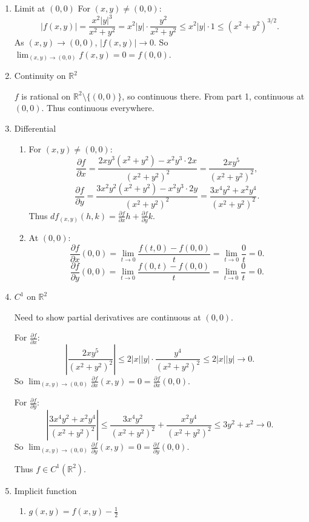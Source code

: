 \documentclass[12pt]{article}
\begin{document}
\begin{answerbox}
\begin{enumerate}
  \item Limit at $(0,0)$
For $(x,y) \neq (0,0)$:
\[
|f(x,y)| = \frac{x^2 |y|^3}{x^2 + y^2} = x^2 |y| \cdot \frac{y^2}{x^2 + y^2} \le x^2 |y| \cdot 1 \le (x^2 + y^2)^{3/2}.
\]
As $(x,y) \to (0,0)$, $|f(x,y)| \to 0$. So $\lim_{(x,y)\to(0,0)} f(x,y) = 0 = f(0,0)$.

  \item Continuity on $\mathbb{R}^2$

$f$ is rational on $\mathbb{R}^2\setminus\{(0,0)\}$, so continuous there. From part 1, continuous at $(0,0)$. Thus continuous everywhere.

  \item Differential
  \begin{enumerate}
    \item For $(x,y) \neq (0,0)$:
\[
\frac{\partial f}{\partial x} = \frac{2x y^3(x^2+y^2) - x^2 y^3 \cdot 2x}{(x^2+y^2)^2} = \frac{2x y^5}{(x^2+y^2)^2},
\]
\[
\frac{\partial f}{\partial y} = \frac{3x^2 y^2(x^2+y^2) - x^2 y^3 \cdot 2y}{(x^2+y^2)^2} = \frac{3x^4 y^2 + x^2 y^4}{(x^2+y^2)^2}.
\]
Thus $df_{(x,y)}(h,k) = \frac{\partial f}{\partial x}h + \frac{\partial f}{\partial y}k$.

    \item At $(0,0)$:
\[
\frac{\partial f}{\partial x}(0,0) = \lim_{t\to0} \frac{f(t,0)-f(0,0)}{t} = \lim_{t\to0} \frac{0}{t} = 0.
\]
\[
\frac{\partial f}{\partial y}(0,0) = \lim_{t\to0} \frac{f(0,t)-f(0,0)}{t} = \lim_{t\to0} \frac{0}{t} = 0.
\]
  \end{enumerate}
  \item $C^1$ on $\mathbb{R}^2$

Need to show partial derivatives are continuous at $(0,0)$.

For $\frac{\partial f}{\partial x}$:
\[
\left|\frac{2x y^5}{(x^2+y^2)^2}\right| \le 2|x||y| \cdot \frac{y^4}{(x^2+y^2)^2} \le 2|x||y| \to 0.
\]
So $\lim_{(x,y)\to(0,0)} \frac{\partial f}{\partial x}(x,y) = 0 = \frac{\partial f}{\partial x}(0,0)$.

For $\frac{\partial f}{\partial y}$:
\[
\left|\frac{3x^4 y^2 + x^2 y^4}{(x^2+y^2)^2}\right| \le \frac{3x^4 y^2}{(x^2+y^2)^2} + \frac{x^2 y^4}{(x^2+y^2)^2} \le 3y^2 + x^2 \to 0.
\]
So $\lim_{(x,y)\to(0,0)} \frac{\partial f}{\partial y}(x,y) = 0 = \frac{\partial f}{\partial y}(0,0)$.

Thus $f \in C^1(\mathbb{R}^2)$.

  \item Implicit function
  \begin{enumerate}
    \item $g(x,y) = f(x,y) - \frac{1}{2}$


\end{enumerate}
\end{enumerate}
\end{answerbox}
\end{document}
